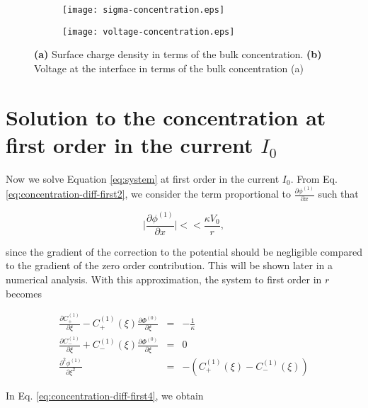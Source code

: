 \begin{figure}[htbp!]
\centering
\begin{subfigure}{.4\textwidth}
  \centering
  \texttt{[image: sigma-concentration.eps]}
  \caption{}
  \label{fig:sub1}
\end{subfigure}%
\begin{subfigure}{.4\textwidth}
  \centering
  \texttt{[image: voltage-concentration.eps]}
  \caption{}
  \label{fig:sub2}
\end{subfigure}
\caption{\textbf{(a)} Surface charge density in terms of the bulk concentration. \textbf{(b)} Voltage at the interface in terms of the bulk concentration (a)}
\label{fig:test}
\end{figure}




\section{Solution to the concentration at first order in the current $I_0$}


Now we solve Equation \ref{eq:system} at first order in the current $I_0$. From Eq. \ref{eq:concentration-diff-first2}, we consider the term proportional to $\frac{\partial \phi^{(1)}}{\partial x}$ such that

\begin{equation}
	\bigg|\frac{\partial \phi^{(1)}}{\partial x}\bigg| << \frac{\kappa V_0}{r},
	\label{eq:approx}
\end{equation}

since the gradient of the correction to the potential should be negligible compared to the gradient of the zero order contribution. This will be shown later in a numerical analysis. With this approximation, the system to first order in $r$ becomes

\begin{eqnarray}
\frac{\partial C^{(1)}_+}{\partial \xi}-C^{(1)}_+(\xi)\frac{\partial \Phi^{(0)}}{\partial \xi} &=& -\frac{1}{\kappa} \\
\label{eq:concentration-diff-first4}
\frac{\partial C^{(1)}_-}{\partial \xi}+C^{(1)}_-(\xi)\frac{\partial \Phi^{(0)}}{\partial \xi} &=& 0 \\
\label{eq:concentration-diff-first5}
\frac{\partial^2  \phi^{(1)}}{\partial \xi^2} &=& -(C^{(1)}_{+}(\xi)-C^{(1)}_{-}(\xi))
\label{eq:concentration-diff-first6}
\end{eqnarray}


In Eq. \ref{eq:concentration-diff-first4}, we obtain

